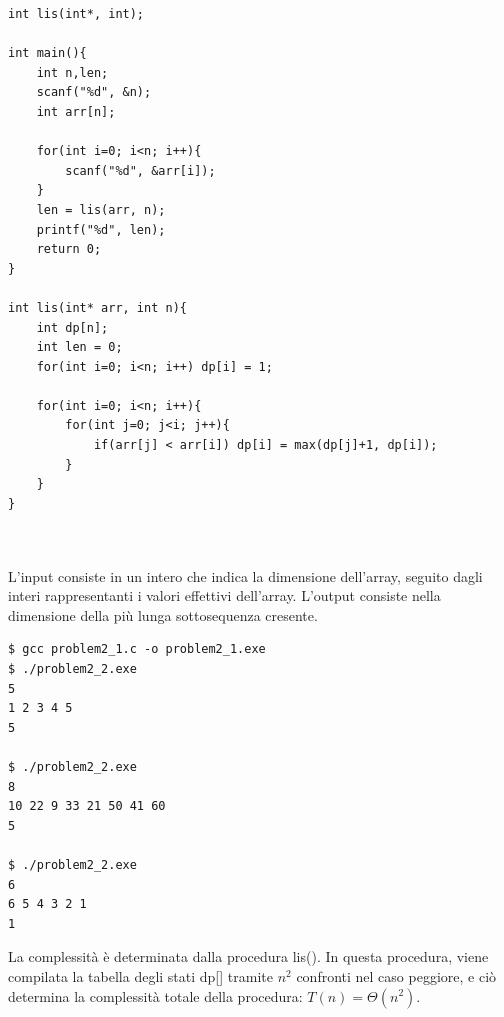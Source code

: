 \documentclass{article}
\begin{document}
\newpage
\begin{lstlisting}
int lis(int*, int);

int main(){
    int n,len;
    scanf("%d", &n);
    int arr[n];
    
    for(int i=0; i<n; i++){
        scanf("%d", &arr[i]);
    }
    len = lis(arr, n);
    printf("%d", len);
    return 0;
}

int lis(int* arr, int n){
    int dp[n];
    int len = 0;
    for(int i=0; i<n; i++) dp[i] = 1;

    for(int i=0; i<n; i++){
        for(int j=0; j<i; j++){
            if(arr[j] < arr[i]) dp[i] = max(dp[j]+1, dp[i]); 
        }
    }
}



\end{lstlisting}
\noindent
L'input consiste in un intero che indica la dimensione dell'array, seguito dagli interi rappresentanti i valori effettivi dell'array. L'output consiste nella dimensione della più lunga sottosequenza cresente. 

\begin{commandline}
\begin{verbatim}
$ gcc problem2_1.c -o problem2_1.exe
$ ./problem2_2.exe 
5
1 2 3 4 5
5

$ ./problem2_2.exe 
8
10 22 9 33 21 50 41 60
5

$ ./problem2_2.exe
6
6 5 4 3 2 1
1
\end{verbatim}
\end{commandline}

\noindent
La complessità è determinata dalla procedura lis(). In questa procedura, viene compilata la tabella degli stati dp[] tramite $n^2$ confronti nel caso peggiore, e ciò determina la complessità totale della procedura: $T(n) = \Theta(n^2)$.
\end{document}
